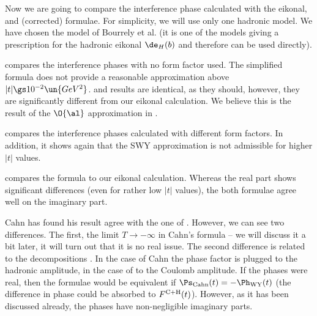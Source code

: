 \bmfig
{}
%
\emfig

Now we are going to compare the interference phase calculated with the eikonal, \WY{} and (corrected) \KL{} formulae. For simplicity, we will use only one hadronic model. We have chosen the model of Bourrely et al. (it is one of the models giving a prescription for the hadronic eikonal $\de_H(b)$ and therefore  can be used directly).


 compares the interference phases with no form factor used. The simplified \WY{} formula does not provide a reasonable approximation above $|t| \gs 10^{-2}\un{GeV^2}$. \WY{} and \KL{} results are identical, as they should, however, they are significantly different from our eikonal calculation. We believe this is the result of the $\O{\al}$ approximation in .

 compares the interference phases calculated with different form factors. In addition, it shows again that the SWY approximation is not admissible for higher $|t|$ values.

 compares the \KL{} formula to our eikonal calculation. Whereas the real part shows significant differences (even for rather low $|t|$ values), the both formulae agree well on the imaginary part.





Cahn has found his result  agree with the one of \WY{} . However, we can see two differences. The first, the limit $T\to -\infty$ in Cahn's formula -- we will discuss it a bit later, it will turn out that it is no real issue. The second difference is related to the decompositions . In the case of Cahn the phase factor is plugged to the hadronic amplitude, in the case of \WaY{} to the Coulomb amplitude. If the phases were real, then the formulae would be equivalent if $\Ps_{\rm Cahn}(t) = - \Ph_{\rm WY}(t)$ (the difference in phase could be absorbed to $F^{\rm C+H}(t)$). However, as it has been discussed already, the phases have non-negligible imaginary parts.

